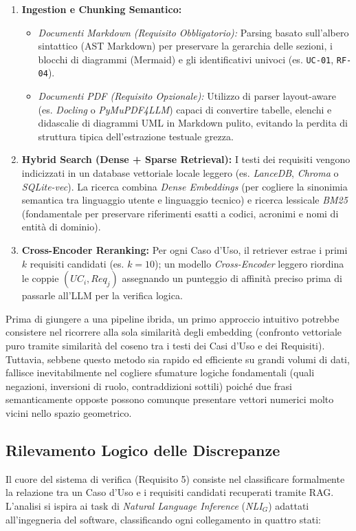 \documentclass[a4paper, 11pt]{article}
\newcommand{\term}[1]{\textit{#1}$_G$} %
\begin{document}
\begin{enumerate}
    \item \textbf{Ingestion e Chunking Semantico:}
    \begin{itemize}[noitemsep]
        \item \textit{Documenti Markdown (Requisito Obbligatorio):} Parsing basato sull'albero sintattico (AST Markdown) per preservare la gerarchia delle sezioni, i blocchi di diagrammi (Mermaid) e gli identificativi univoci (es. \texttt{UC-01}, \texttt{RF-04}).
        \item \textit{Documenti PDF (Requisito Opzionale):} Utilizzo di parser layout-aware (es. \textit{Docling} o \textit{PyMuPDF4LLM}) capaci di convertire tabelle, elenchi e didascalie di diagrammi UML in Markdown pulito, evitando la perdita di struttura tipica dell'estrazione testuale grezza.
    \end{itemize}
    \item \textbf{Hybrid Search (Dense + Sparse Retrieval):} I testi dei requisiti vengono indicizzati in un database vettoriale locale leggero (es. \textit{LanceDB}, \textit{Chroma} o \textit{SQLite-vec}). La ricerca combina \textit{Dense Embeddings} (per cogliere la sinonimia semantica tra linguaggio utente e linguaggio tecnico) e ricerca lessicale \textit{BM25} (fondamentale per preservare riferimenti esatti a codici, acronimi e nomi di entità di dominio).
    \item \textbf{Cross-Encoder Reranking:} Per ogni Caso d'Uso, il retriever estrae i primi $k$ requisiti candidati (es. $k=10$); un modello \textit{Cross-Encoder} leggero riordina le coppie $(UC_i, Req_j)$ assegnando un punteggio di affinità preciso prima di passarle all'LLM per la verifica logica.
\end{enumerate}
Prima di giungere a una pipeline ibrida, un primo approccio intuitivo potrebbe consistere nel ricorrere alla sola similarità degli embedding (confronto vettoriale puro tramite similarità del coseno tra i testi dei Casi d'Uso e dei Requisiti). Tuttavia, sebbene questo metodo sia rapido ed efficiente su grandi volumi di dati, fallisce inevitabilmente nel cogliere sfumature logiche fondamentali (quali negazioni, inversioni di ruolo, contraddizioni sottili) poiché due frasi semanticamente opposte possono comunque presentare vettori numerici molto vicini nello spazio geometrico.
\subsection{Rilevamento Logico delle Discrepanze}
Il cuore del sistema di verifica (Requisito 5) consiste nel classificare formalmente la relazione tra un Caso d'Uso e i requisiti candidati recuperati tramite RAG. L'analisi si ispira ai task di \textit{Natural Language Inference} (\term{NLI}) adattati all'ingegneria del software, classificando ogni collegamento in quattro stati:
\end{document}
